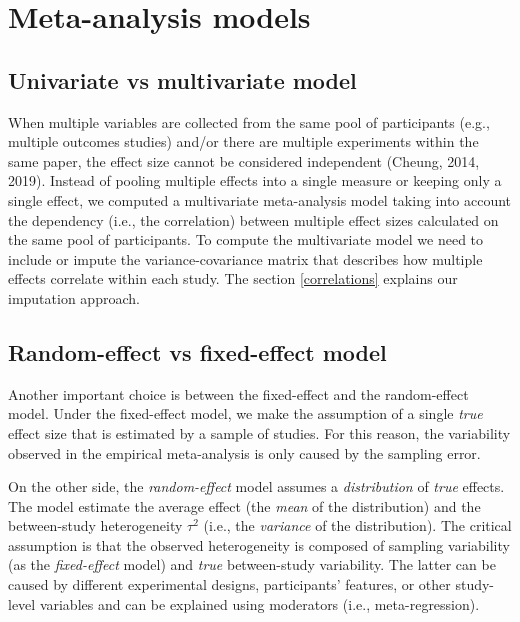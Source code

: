 \documentclass[
]{article}
\begin{document}
\hypertarget{models}{%
\section{Meta-analysis models}\label{models}}

\hypertarget{uni-vs-multi}{%
\subsection{Univariate vs multivariate model}\label{uni-vs-multi}}

When multiple variables are collected from the same pool of participants (e.g., multiple outcomes studies) and/or there are multiple experiments within the same paper, the effect size cannot be considered independent (Cheung, 2014, 2019). Instead of pooling multiple effects into a single measure or keeping only a single effect, we computed a multivariate meta-analysis model taking into account the dependency (i.e., the correlation) between multiple effect sizes calculated on the same pool of participants. To compute the multivariate model we need to include or impute the variance-covariance matrix that describes how multiple effects correlate within each study. The section \ref{correlations} explains our imputation approach.

\hypertarget{random-effect-vs-fixed-effect-model}{%
\subsection{Random-effect vs fixed-effect model}\label{random-effect-vs-fixed-effect-model}}

Another important choice is between the fixed-effect and the random-effect model. Under the fixed-effect model, we make the assumption of a single \emph{true} effect size that is estimated by a sample of studies. For this reason, the variability observed in the empirical meta-analysis is only caused by the sampling error.

On the other side, the \emph{random-effect} model assumes a \emph{distribution} of \emph{true} effects. The model estimate the average effect (the \emph{mean} of the distribution) and the between-study heterogeneity \(\tau^2\) (i.e., the \emph{variance} of the distribution). The critical assumption is that the observed heterogeneity is composed of sampling variability (as the \emph{fixed-effect} model) and \emph{true} between-study variability. The latter can be caused by different experimental designs, participants' features, or other study-level variables and can be explained using moderators (i.e., meta-regression).
\end{document}
